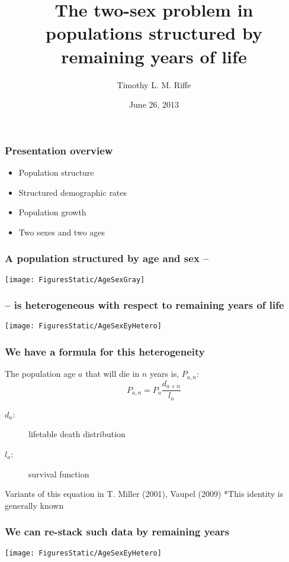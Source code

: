 \documentclass{beamer}
\title{The two-sex problem in populations structured by remaining years of life}
\author[Tim Riffe]{Timothy L. M. Riffe}
\institute[UAB]{
  Department of Geography \\
  Universitat Aut\`{o}noma de Barcelona \\
  Centre d'Estudis Demogr\`{a}fics \\
}
\date{June 26, 2013}
\begin{document}
\begin{frame}
  \titlepage
\end{frame}
\begin{frame}
  \frametitle{Presentation overview}

\begin{itemize}
  \item Population structure
  \item Structured demographic rates
  \item Population growth
  \item Two sexes and two ages
\end{itemize}

\end{frame}
\begin{frame}
\frametitle{A population structured by age and sex --}
\texttt{[image: FiguresStatic/AgeSexGray]}
\end{frame}
\begin{frame}
\frametitle{-- is heterogeneous with respect to remaining years of life}
\texttt{[image: FiguresStatic/AgeSexEyHetero]}
\end{frame}
\begin{frame}
\frametitle{We have a formula for this heterogeneity}
The population age $a$ that will die in $n$ years is, $P_{a,n}$:
 \begin{equation}
   P_{a,n} = P_a \frac{d_{a+n}}{l_a}
 \end{equation}
 \begin{description}
 \item[$d_a$:] lifetable death distribution 
 \item[$l_a$:] survival function
 \end{description}
\pause 

Variants of this equation in T. Miller (2001), Vaupel (2009)
*This identity is generally known
\end{frame}

\begin{frame}
\frametitle{We can re-stack such data by remaining years}
\texttt{[image: FiguresStatic/AgeSexEyHetero]}
\end{frame}
\end{document}
